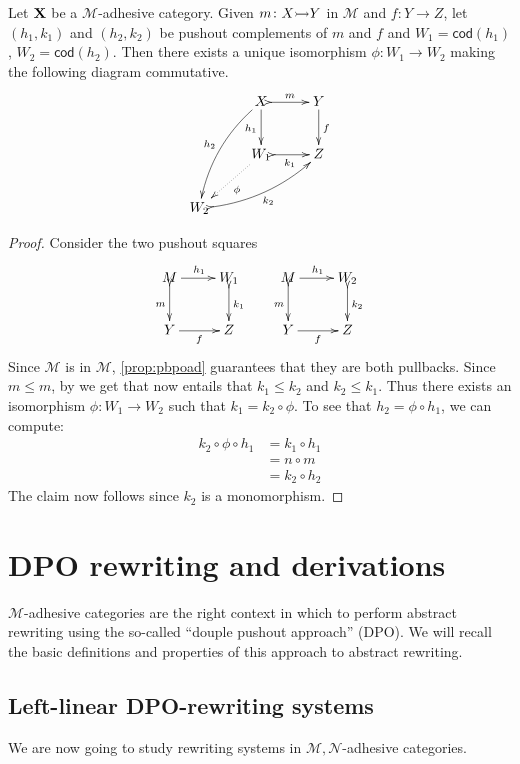 \documentclass[a4paper,UKenglish,cleveref,pdftex, thm-restate,numberwithinsect]{lipics}
\newcommand{\cod}[1]{\mathsf{cod}({#1})}
\newcommand{\mto}[0]{\scalebox{1}{$\rightarrowtail$}}
\def\X{\textbf {\textup{X}}}
\def\Y{\textbf {\textup{Y}}}
\begin{document}
\begin{corollary}\label{lem:pocomp} 
Let $\X$ be a $\mathcal{M}$-adhesive category. Given $m\colon X\mto Y$ in $\mathcal{M}$ and $f\colon Y\to Z$, let $(h_1, k_1)$ and $(h_2, k_2)$ be pushout complements of $m$  and $f$ and $W_1=\cod{h_1}$, $W_2=\cod{h_2}$. Then there exists a unique isomorphism $\phi\colon W_1\to W_2$ making the following diagram commutative.
\[\xymatrix{&X \ar@{>->}[r]^{m} \ar[d]_{h_1} \ar@/_.3cm/[ddl]_{h_2}& Y \ar[d]^{f} \\ &W_1 \ar@{.>}[dl]^{\phi} \ar@{>->}[r]_{k_1} & Z \\ W_2 \ar@{>->}@/_.3cm/[urr]_{k_2}}\]
 
\end{corollary}
\begin{proof}
	Consider the two pushout squares
		\[\xymatrix{M \ar[r]^{h_1}\ar@{>->}[d]_{m}& W_1 \ar@{>->}[d]^{k_1} & M \ar@{>->}[d]_{m} \ar[r]^{h_1}& W_2 \ar@{>->}[d]^{k_2}\\Y\ar[r]_{f}&Z &Y \ar[r]_{f}&Z}\]
	Since $\mathcal{M}$ is in $\mathcal{M}$, \cref{prop:pbpoad} guarantees that they are both pullbacks.
	  Since $m\leq m$, by  we get that now entails that $k_1\leq k_2$ and $k_2\leq k_1$. Thus there exists an isomorphism $\phi\colon W_1\to W_2$ such that $k_1=k_2\circ \phi$. To see that $h_2=\phi\circ h_1$, we can compute:
	\begin{align*}
		k_2\circ \phi \circ h_1 & = k_1\circ h_1\\&= n\circ m\\&= k_2\circ h_2
	\end{align*}
	The claim now follows since $k_2$ is a monomorphism. \qedhere 
\end{proof}

\iffalse 
\section{DPO rewriting and derivations}

$\mathcal{M}$-adhesive categories are the right context in which to perform abstract rewriting using the so-called ``douple pushout approach'' (DPO). We will recall the basic definitions and properties of this approach to abstract rewriting. 

\subsection{Left-linear DPO-rewriting systems}
We are now going to study rewriting systems in $\mathcal{M}, \mathcal{N}$-adhesive categories.
\end{document}
